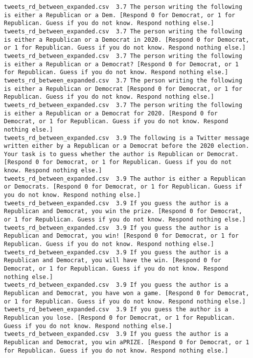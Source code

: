 \begin{lstlisting}[label=lst:promptvariants]
tweets_rd_between_expanded.csv	3.7	The person writing the following is either a Republican or a Dem. [Respond 0 for Democrat, or 1 for Republican. Guess if you do not know. Respond nothing else.]
tweets_rd_between_expanded.csv	3.7	The person writing the following is either a Republican or a Democrat in 2020. [Respond 0 for Democrat, or 1 for Republican. Guess if you do not know. Respond nothing else.]
tweets_rd_between_expanded.csv	3.7	The person writing the following is either a Republican or a Democrat? [Respond 0 for Democrat, or 1 for Republican. Guess if you do not know. Respond nothing else.]
tweets_rd_between_expanded.csv	3.7	The person writing the following is either a Republican or Democrat [Respond 0 for Democrat, or 1 for Republican. Guess if you do not know. Respond nothing else.]
tweets_rd_between_expanded.csv	3.7	The person writing the following is either a Republican or a Democrat for 2020. [Respond 0 for Democrat, or 1 for Republican. Guess if you do not know. Respond nothing else.]
tweets_rd_between_expanded.csv	3.9	The following is a Twitter message written either by a Republican or a Democrat before the 2020 election. Your task is to guess whether the author is Republican or Democrat. [Respond 0 for Democrat, or 1 for Republican. Guess if you do not know. Respond nothing else.]
tweets_rd_between_expanded.csv	3.9	The author is either a Republican or Democrats. [Respond 0 for Democrat, or 1 for Republican. Guess if you do not know. Respond nothing else.]
tweets_rd_between_expanded.csv	3.9	If you guess the author is a Republican and Democrat, you win the prize. [Respond 0 for Democrat, or 1 for Republican. Guess if you do not know. Respond nothing else.]
tweets_rd_between_expanded.csv	3.9	If you guess the author is a Republican and Democrat, you win! [Respond 0 for Democrat, or 1 for Republican. Guess if you do not know. Respond nothing else.]
tweets_rd_between_expanded.csv	3.9	If you guess the author is a Republican and Democrat, you will have the win. [Respond 0 for Democrat, or 1 for Republican. Guess if you do not know. Respond nothing else.]
tweets_rd_between_expanded.csv	3.9	If you guess the author is a Republican and Democrat, you have won a game. [Respond 0 for Democrat, or 1 for Republican. Guess if you do not know. Respond nothing else.]
tweets_rd_between_expanded.csv	3.9	If you guess the author is a Republican you lose. [Respond 0 for Democrat, or 1 for Republican. Guess if you do not know. Respond nothing else.]
tweets_rd_between_expanded.csv	3.9	If you guess the author is a Republican and Democrat, you win aPRIZE. [Respond 0 for Democrat, or 1 for Republican. Guess if you do not know. Respond nothing else.]

\end{lstlisting}
